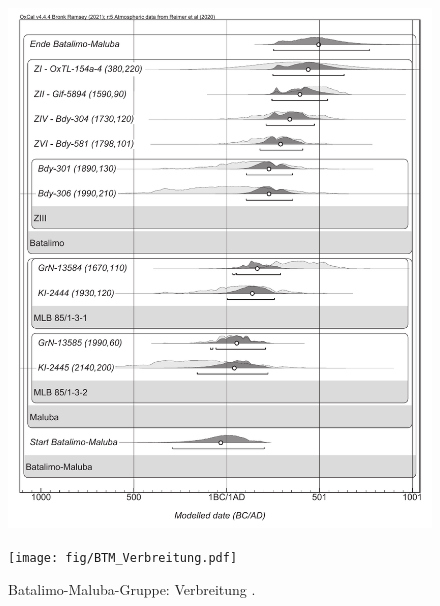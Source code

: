 \begin{figure}[tb]
	\noindent\begin{minipage}[b]{\columnwidth}
		\includegraphics[width=\columnwidth]{fig/BTM_14C.pdf}
	\end{minipage}\hfill
	\noindent\begin{minipage}[b]{\columnwidth}
	\end{minipage}
\end{figure}

\begin{figure}[p]
	\centering
	\texttt{[image: fig/BTM\_Verbreitung.pdf]}
	\caption{Batalimo-Maluba-Gruppe: Verbreitung \parencites[grau; nach][206]{deBayledesHermens.1975}[41\,f. Abb.~4]{Kote.1992}.}
	\label{fig:BTM-Verbreitung}
\end{figure}

